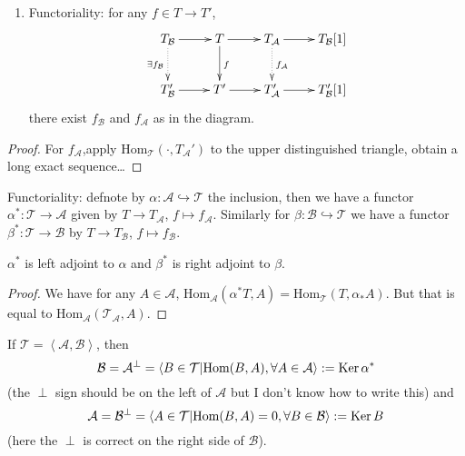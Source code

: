 \begin{proposition}
\label{proposition-properties-of-semiorthogonal-decomposition}
\begin{enumerate}
\item Functoriality: for any $f \in T \to T'$,
$$
\xymatrix{
T_{\mathcal{B}}\ar@{.>}[d]_{\exists f_{\mathcal{B}}}\ar[r]& T\ar[d]^f\ar[r]
& T_{\mathcal{A}}\ar@{.>}[d]^{f_{\mathcal{A}}}\ar[r]& T_{\mathcal{B}}[1]\\
T_{\mathcal{B}}'\ar[r]& T'\ar[r]& T'_{\mathcal{A}}\ar[r]& T'_{\mathcal{B}}[1]
}
$$
there exist $f_{\mathcal{B}}$ and $f_{\mathcal{A}}$ as in the diagram.
\end{enumerate}
\end{proposition}

\begin{proof}
For $f_{\mathcal{A}}$,apply $\text{Hom}_{\mathcal{T}}(\cdot,T_{\mathcal{A}}')$ 
to the upper distinguished triangle, obtain a long exact sequence…
\end{proof}

Functoriality: defnote by $\alpha:\mathcal{A} \hookrightarrow  \mathcal{T}$ the
inclusion, then we have a functor $\alpha^*:\mathcal{T} \to \mathcal{A}$ given
by $T \to T_{\mathcal{A}}$, $f \mapsto  f_{\mathcal{A}}$. Similarly for
$\beta:\mathcal{B} \hookrightarrow  \mathcal{T}$ we have a functor $\beta
^*:\mathcal{T} \to \mathcal{B}$ by $T \to T_{\mathcal{B}}$, $f \mapsto
f_{\mathcal{B}}$.

\begin{lemma}
\label{lemma-alpha-and-beta-adjoint}
$\alpha^*$ is left adjoint to $\alpha$ and $\beta^*$ is right adjoint to $\beta.$
\end{lemma}

\begin{proof}
We have for any $A \in \mathcal{A}$,
$\text{Hom}_{\mathcal{A}}(\alpha^*T,A)=\text{Hom}_{\mathcal{T}}(T,\alpha_*A)$.
But that is equal to $\text{Hom}_{\mathcal{A}}(\mathcal{T}_{\mathcal{A}},A)$.
\end{proof}

\begin{exercise}
\label{exercise-orthogonal}
If $\mathcal{T}=\left<\mathcal{A},\mathcal{B}\right>$, then
$$
\mathcal{B}=\mathcal{A}^\perp=\left<B \in \mathcal{T} |
\text{Hom}(B,A), \forall A \in \mathcal{A}\right>:=\mathop{\mathrm{Ker}} \alpha^*
$$
(the $\perp$ sign should be on the left of $\mathcal{A}$ but I don't know how to
write this) and 
$$
\mathcal{A}=\mathcal{B}^\perp=\left<A \in \mathcal{T} |
\text{Hom}(B,A)=0,\forall B \in \mathcal{B}\right>:=\mathop{\mathrm{Ker}} B
$$
(here the $\perp$ is correct on the right side of $\mathcal{B}$).
\end{exercise}

